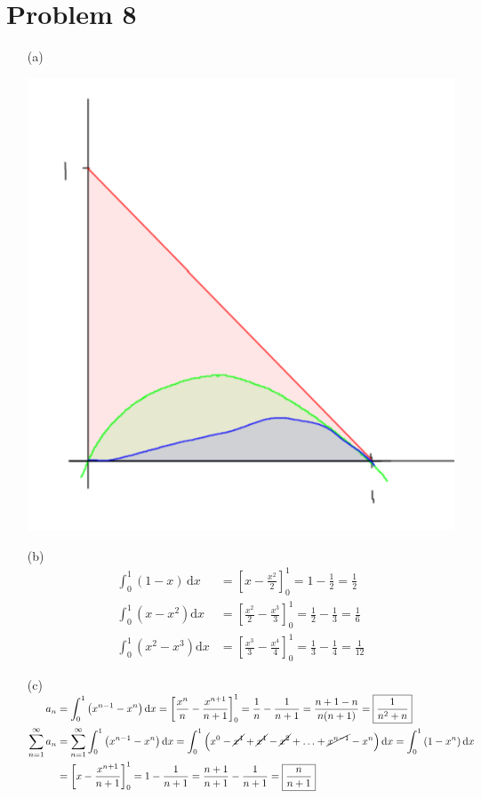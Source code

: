 \documentclass[preview, margin=0.6in]{standalone}
\newcommand*{\problem}[1]{\section*{Problem #1}}
\begin{document}
\problem{8}
\begin{itemize}
	\item[(a)]
		\phantom{}

		\begin{center}
			\includegraphics[width=0.5\linewidth]{q8a.png}
		\end{center}

	\item[(b)]
		\begin{align*}
		    \int_{0}^{1}(1-x)\,\mathrm{d}x
			&=\left[x-\frac{x^2}{2}\right]_{0}^{1}
			=1-\frac{1}{2}
			=\frac{1}{2} \\
			\int_{0}^{1}\left(x-x^2\right)\mathrm{d}x
			&=\left[\frac{x^2}{2}-\frac{x^3}{3}\right]_{0}^{1}
			=\frac12-\frac13
			=\frac16 \\
			\int_{0}^{1}\left(x^2-x^3\right)\mathrm{d}x
			&=\left[\frac{x^3}{3}-\frac{x^4}{4}\right]_{0}^{1}
			=\frac13-\frac14
			=\frac1{12}
		\end{align*}

	\item[(c)]
		$\begin{aligned}[t]
			a_n
			&=\int_{0}^{1}\left(x^{n-1}-x^n\right)\mathrm{d}x
			=\left[\frac{x^n}{n}-\frac{x^{n+1}}{n+1}\right]_{0}^{1}
			=\frac{1}{n}-\frac{1}{n+1}
			=\frac{n+1-n}{n(n+1)}
			=\boxed{\frac{1}{n^2+n}} \\
			\sum_{n=1}^{\infty}a_n
			&=\sum_{n=1}^{\infty}\int_{0}^{1}\left(x^{n-1}-x^n\right)\mathrm{d}x
			=\int_{0}^{1}\left(x^0-\cancel{x^1}+\cancel{x^1}-\cancel{x^2}+\ldots+\cancel{x^{n-1}}-x^n\right)\mathrm{d}x
			=\int_{0}^{1}\left(1-x^n\right)\mathrm{d}x \\
			&=\left[x-\frac{x^{n+1}}{n+1}\right]_{0}^{1}
			=1-\frac{1}{n+1}
			=\frac{n+1}{n+1}-\frac{1}{n+1}
			=\boxed{\frac{n}{n+1}}
		\end{aligned}$

\end{itemize}
\end{document}
